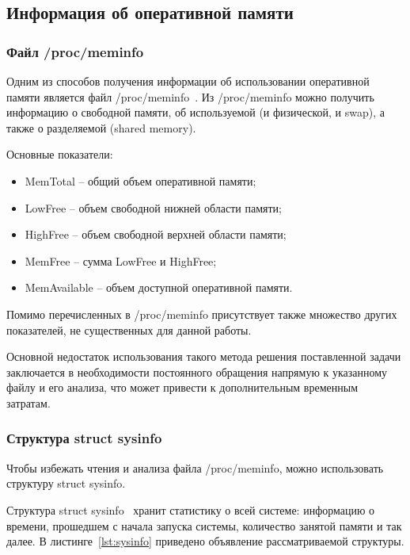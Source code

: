 \subsection{Информация об оперативной памяти}

\subsubsection{Файл /proc/meminfo}

Одним из способов получения информации об использовании оперативной памяти является файл /proc/meminfo~\cite{meminfo}. Из /proc/meminfo можно получить информацию о свободной памяти, об используемой (и физической, и swap), а также о разделяемой (shared memory).

Основные показатели:

\begin{itemize}
	\item MemTotal -- общий объем оперативной памяти;
	
	\item LowFree -- объем свободной нижней области памяти;
	
	\item HighFree -- объем свободной верхней области памяти;
	
	\item MemFree -- сумма LowFree и HighFree;
	
	\item MemAvailable -- объем доступной оперативной памяти.
\end{itemize}

Помимо перечисленных в /proc/meminfo присутствует также множество других показателей, не существенных для данной работы.

Основной недостаток использования такого метода решения поставленной задачи заключается в необходимости постоянного обращения напрямую к указанному файлу и его анализа, что может привести к дополнительным временным затратам.

\subsubsection{Структура struct sysinfo}

Чтобы избежать чтения и анализа файла /proc/meminfo, можно использовать структуру struct sysinfo.

Структура struct sysinfo~\cite{sysinfo} хранит статистику о всей системе: информацию о времени, прошедшем с начала запуска системы, количество занятой памяти и так далее. В листинге~\ref{lst:sysinfo} приведено объявление рассматриваемой структуры.

